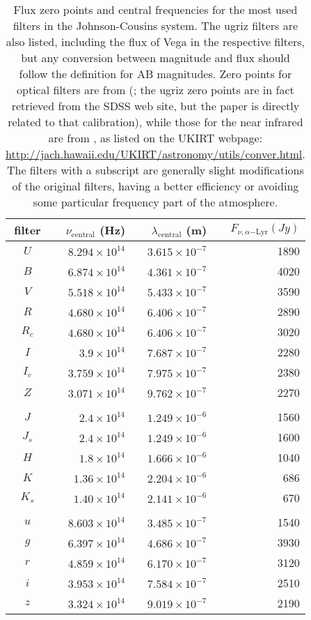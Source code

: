 \documentclass[12pt,a4paper]{article}
\begin{document}
\begin{table}
\begin{tabular}{c|r|r|r}
filter & $\nu_{\mathrm{central}}$ (Hz) & $\lambda_{\mathrm{central}}$ (m) & $F_{\nu, \alpha\mathrm{-Lyr}} (Jy)$ \\
\hline
$U$   & $8.294 \times 10^{14}$ & $3.615 \times 10^{-7}$ & 1890 \\
$B$   & $6.874 \times 10^{14}$ & $4.361 \times 10^{-7}$ & 4020 \\
$V$   & $5.518 \times 10^{14}$ & $5.433 \times 10^{-7}$ & 3590 \\
$R$   & $4.680 \times 10^{14}$ & $6.406 \times 10^{-7}$ & 2890 \\
$R_c$ & $4.680 \times 10^{14}$ & $6.406 \times 10^{-7}$ & 3020 \\
$I$   & $3.9   \times 10^{14}$ & $7.687 \times 10^{-7}$ & 2280 \\
$I_c$ & $3.759 \times 10^{14}$ & $7.975 \times 10^{-7}$ & 2380 \\
$Z$   & $3.071 \times 10^{14}$ & $9.762 \times 10^{-7}$ & 2270 \\
&&&\\
$J$   & $2.4   \times 10^{14}$ & $1.249 \times 10^{-6}$ & 1560 \\
$J_s$ & $2.4   \times 10^{14}$ & $1.249 \times 10^{-6}$ & 1600 \\
$H$   & $1.8   \times 10^{14}$ & $1.666 \times 10^{-6}$ & 1040 \\
$K$   & $1.36  \times 10^{14}$ & $2.204 \times 10^{-6}$ &  686 \\
$K_s$ & $1.40  \times 10^{14}$ & $2.141 \times 10^{-6}$ &  670 \\
&&&\\
$u$   & $8.603 \times 10^{14}$ & $3.485 \times 10^{-7}$ & 1540 \\
$g$   & $6.397 \times 10^{14}$ & $4.686 \times 10^{-7}$ & 3930 \\
$r$   & $4.859 \times 10^{14}$ & $6.170 \times 10^{-7}$ & 3120 \\
$i$   & $3.953 \times 10^{14}$ & $7.584 \times 10^{-7}$ & 2510 \\
$z$   & $3.324 \times 10^{14}$ & $9.019 \times 10^{-7}$ & 2190 \\
\end{tabular}
\caption{\label{table:zeropointfluxes}
Flux zero points and central frequencies for the most used filters in the Johnson-Cousins system. The ugriz filters are also listed, including the flux of Vega in the respective filters, but any conversion between magnitude and flux should follow the definition for AB magnitudes. Zero points for optical filters are from \citeauthor{fukugita1995:pasp107:945} (\citeyear{fukugita1995:pasp107:945}; the ugriz zero points are in fact retrieved from the SDSS web site, but the paper is directly related to that calibration), while those for the near infrared are from \citet{tokunaga2005:pasp117:421}, as listed on the UKIRT webpage: \url{http://jach.hawaii.edu/UKIRT/astronomy/utils/conver.html}. The filters with a subscript are generally slight modifications of the original filters, having a better efficiency or avoiding some particular frequency part of the atmosphere.}
\end{table}
\end{document}
